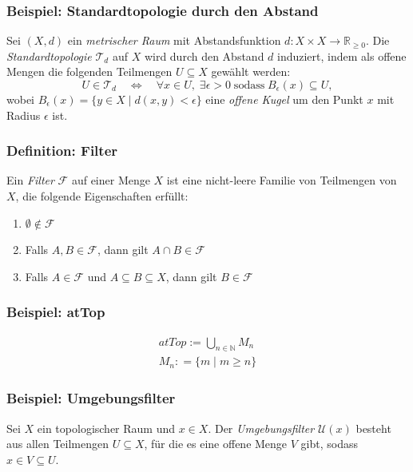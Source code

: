 \documentclass{beamer}
\begin{document}
\begin{frame}
    \frametitle{Beispiel: Standardtopologie durch den Abstand}
    Sei $(X, d)$ ein \emph{metrischer Raum} mit Abstandsfunktion $d: X \times X \rightarrow \mathbb{R}_{\geq 0}$.
    Die \emph{Standardtopologie} $\mathcal{T}_d$ auf $X$ wird durch den Abstand $d$ induziert, indem als offene Mengen die folgenden Teilmengen $U \subseteq X$ gewählt werden:
    \[
    U \in \mathcal{T}_d \quad \Leftrightarrow \quad \forall x \in U, \; \exists \epsilon > 0 \; \text{sodass} \; B_\epsilon(x) \subseteq U,
    \]
    wobei $B_\epsilon(x) = \{ y \in X \mid d(x, y) < \epsilon \}$ eine \emph{offene Kugel} um den Punkt $x$ mit Radius $\epsilon$ ist.
\end{frame}




\begin{frame}
    \frametitle{Definition: Filter}
    Ein \emph{Filter} $\mathcal{F}$ auf einer Menge $X$ ist eine nicht-leere Familie von Teilmengen von $X$, die folgende Eigenschaften erfüllt:
    \begin{enumerate}
        \item $\emptyset \notin \mathcal{F}$
        \item Falls $A, B \in \mathcal{F}$, dann gilt $A \cap B \in \mathcal{F}$
        \item Falls $A \in \mathcal{F}$ und $A \subseteq B \subseteq X$, dann gilt $B \in \mathcal{F}$
    \end{enumerate}
\end{frame}


\begin{frame}
    \frametitle{Beispiel: atTop}
   
    \begin{align}
        atTop := \bigcup_{n \in \mathbb{N}} M_n  \\
        M_n : = \{ m    \mid m \geq n\}
    \end{align}
\end{frame}


\begin{frame}
    \frametitle{Beispiel: Umgebungsfilter}
    Sei $X$ ein topologischer Raum und $x \in X$. Der \emph{Umgebungsfilter} $\mathcal{U}(x)$ besteht aus allen Teilmengen $U \subseteq X$, für die es eine offene Menge $V$ gibt, sodass $x \in V \subseteq U$.
\end{frame}
\end{document}
